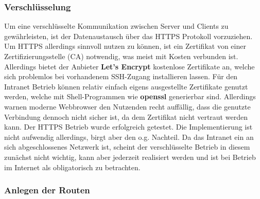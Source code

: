 \subsubsection{Verschlüsselung}\label{sec:encrypted}
Um eine verschlüsselte Kommunikation zwischen Server und Clients zu gewährleisten, ist der Datenaustausch über das HTTPS Protokoll vorzuziehen. Um HTTPS allerdings sinnvoll nutzen zu können, ist ein Zertifikat von einer Zertifizierungsstelle (CA) notwendig, was meist mit Kosten verbunden ist. Allerdings bietet der Anbieter \textbf{Let's Encrypt}\cite{LetsEncrypt.org} kostenlose Zertifikate an, welche sich problemlos bei vorhandenem SSH-Zugang installieren lassen. Für den Intranet Betrieb können relativ einfach eigens ausgestellte Zertifikate genutzt werden, welche mit Shell-Programmen wie \textbf{openssl} generierbar sind\cite{Copes2018}. Allerdings warnen moderne Webbrowser den Nutzenden recht auffällig, dass die genutzte Verbindung dennoch nicht sicher ist, da dem Zertifikat nicht vertraut werden kann. Der HTTPS Betrieb wurde erfolgreich getestet. Die Implementierung ist nicht aufwendig allerdings, birgt aber den o.g. Nachteil. Da das Intranet ein an sich abgeschlossenes Netzwerk ist, scheint der verschlüsselte Betrieb in diesem zunächst nicht wichtig, kann aber jederzeit realisiert werden und ist bei Betrieb im Internet als obligatorisch zu betrachten. 

\subsubsection{Anlegen der Routen}\label{sec:anlegrouten}

